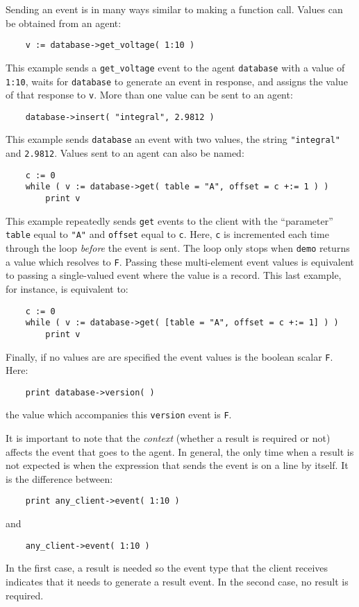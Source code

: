 Sending an event is in many ways similar to making a function call. Values
can be obtained from an agent:
\begin{verbatim}
    v := database->get_voltage( 1:10 )
\end{verbatim}
This example sends a {\tt get\_voltage} event to the agent {\tt database}
with a value of {\tt 1:10}, waits for {\tt database} to generate an event in
response, and assigns the value of that response to {\tt v}.
More than one value can be sent to an agent:
\begin{verbatim}
    database->insert( "integral", 2.9812 )
\end{verbatim}
This example sends {\tt database} an event with two values, the string
{\tt "integral"} and {\tt 2.9812}.  Values sent to an agent can also be
named:
\begin{verbatim}
    c := 0
    while ( v := database->get( table = "A", offset = c +:= 1 ) )
        print v
\end{verbatim}
This example repeatedly sends {\tt get} events to the client with the
``parameter'' {\tt table} equal to \verb+"A"+ and {\tt offset} equal to
{\tt c}. Here, {\tt c} is incremented each time through the 
loop {\em before}
the event is sent. The loop only stops when {\tt demo} 
returns a value which
resolves to {\tt F}. Passing these multi-element event 
values is equivalent
to passing a single-valued event where the value is a record.  
This last example,
for instance, is equivalent to:
\begin{verbatim}
    c := 0
    while ( v := database->get( [table = "A", offset = c +:= 1] ) )
        print v
\end{verbatim}
Finally, if no values are are specified the event values is the boolean
scalar {\tt F}. Here:
\begin{verbatim}
    print database->version( )
\end{verbatim}
the value which accompanies this {\tt version} event is {\tt F}.

It is important to note that the {\em context} (whether a result is required
or not) affects the event that goes to the agent. In general,
the only time when a result is not expected is when the expression that
sends the event is on a line by itself. It is the difference between:
\begin{verbatim}
    print any_client->event( 1:10 )
\end{verbatim}
and
\begin{verbatim}
    any_client->event( 1:10 )
\end{verbatim}
In the first case, a result is needed so the event type that the client
receives indicates that it needs to generate a result event. In the second
case, no result is required.

